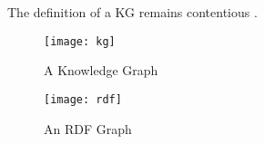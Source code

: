 
\begin{remark}
    The definition of a KG remains contentious \cite{Hogan2021KG,commonsenseKG}.
\end{remark}

\begin{figure}[H]
    \centering
    \texttt{[image: kg]}
    \caption[]{A Knowledge Graph}
\end{figure}

\begin{figure}[H]
    \centering
    \texttt{[image: rdf]}
    \caption[]{An RDF Graph}
\end{figure}







